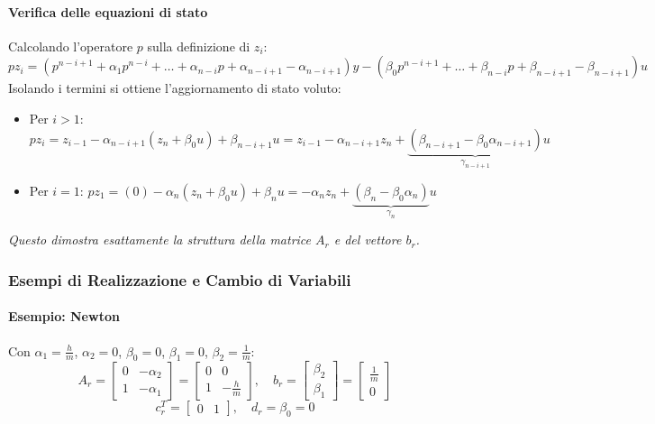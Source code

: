 \documentclass[11pt,a4paper]{article}
\begin{document}
\paragraph{Verifica delle equazioni di stato}
Calcolando l'operatore $p$ sulla definizione di $z_i$:
$$ pz_i = (p^{n-i+1} + \alpha_1 p^{n-i} + \dots + \alpha_{n-i} p + \alpha_{n-i+1} - \alpha_{n-i+1})y - (\beta_0 p^{n-i+1} + \dots + \beta_{n-i} p + \beta_{n-i+1} - \beta_{n-i+1})u $$
Isolando i termini si ottiene l'aggiornamento di stato voluto:
\begin{itemize}
    \item Per $i > 1$: $pz_i = z_{i-1} - \alpha_{n-i+1}(z_n + \beta_0 u) + \beta_{n-i+1} u = z_{i-1} - \alpha_{n-i+1} z_n + \underbrace{(\beta_{n-i+1} - \beta_0 \alpha_{n-i+1})}_{\gamma_{n-i+1}}u$
    \item Per $i = 1$: $pz_1 = (0) - \alpha_n(z_n + \beta_0 u) + \beta_n u = -\alpha_n z_n + \underbrace{(\beta_n - \beta_0 \alpha_n)}_{\gamma_n}u$
\end{itemize}
\textit{Questo dimostra esattamente la struttura della matrice $A_r$ e del vettore $b_r$.}

\subsubsection{Esempi di Realizzazione e Cambio di Variabili}

\paragraph{Esempio: Newton}
Con $\alpha_1 = \frac{h}{m}$, $\alpha_2 = 0$, $\beta_0 = 0$, $\beta_1 = 0$, $\beta_2 = \frac{1}{m}$:
$$ A_r = \begin{bmatrix} 0 & -\alpha_2 \\ 1 & -\alpha_1 \end{bmatrix} = \begin{bmatrix} 0 & 0 \\ 1 & -\frac{h}{m} \end{bmatrix}, \quad
b_r = \begin{bmatrix} \beta_2 \\ \beta_1 \end{bmatrix} = \begin{bmatrix} \frac{1}{m} \\ 0 \end{bmatrix} $$
$$ c_r^T = \begin{bmatrix} 0 & 1 \end{bmatrix}, \quad d_r = \beta_0 = 0 $$
\end{document}
